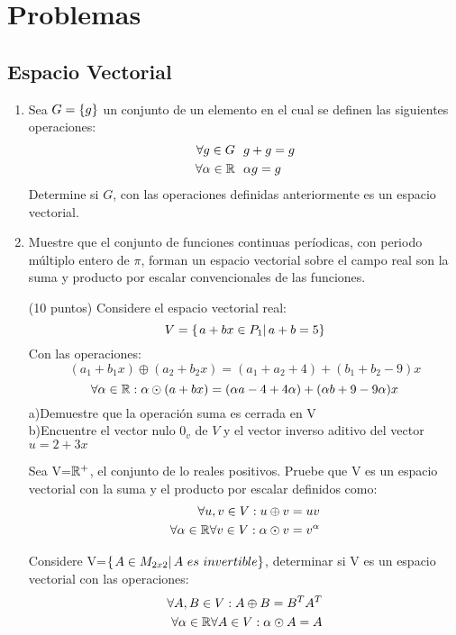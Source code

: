 \section{Problemas}
\subsection{Espacio Vectorial}
\begin{enumerate}[1.]
\item Sea $G= \left\{g \right\} $ un conjunto de un elemento en el cual se definen las siguientes operaciones:
\begin{align*}
\forall g \in G\ \  &g+g=g\\
\forall \alpha\in \mathbb{R}\ \ &\alpha g=g \\
\end{align*}
Determine si $G$, con las operaciones definidas anteriormente es un espacio vectorial.

\item Muestre que el conjunto de funciones continuas períodicas, con periodo múltiplo entero de $\pi$, forman un espacio vectorial sobre el campo real son la suma y producto por escalar convencionales de las funciones.


\begin{prob}
(10 puntos) Considere el espacio vectorial real:
\[V=\left\{ \left. a+bx \in P_1\right| a+b=5 \right\}\]
Con las operaciones:
 \[(a_1+b_1 x)\oplus(a_2+b_2 x)=(a_1+a_2+4)+(b_1+b_2-9)x\]
 \[ \forall \alpha \in \mathbb{R}:  \alpha\odot (a+b x)=(\alpha a-4+4\alpha)+(\alpha b+9-9\alpha)x\]
 a)Demuestre que la operaci\'on suma es cerrada en V~\\
 b)Encuentre el vector nulo $0_v$ de $V$ y el vector inverso aditivo del vector $u=2+3x$
\end{prob}

\begin{prob}
Sea V=$\mathbb{R}^+$, el conjunto de lo reales positivos. Pruebe que V es un espacio vectorial con la suma y el producto por escalar definidos como:
\begin{align*}
\forall u, v \in V: u\oplus v=uv\\
\forall \alpha \in \mathbb{R} \forall v \in V: \alpha\odot v =v^\alpha
\end{align*}
\end{prob}

\begin{prob}
Considere V=$\llaves{A\in M_{2x2}}{A\ es\ invertible}$, determinar si V es un espacio vectorial con las operaciones:
\begin{align*}
\forall A, B \in V: A\oplus B=B^T A^T\\
\forall \alpha \in \mathbb{R} \forall A \in V: \alpha\odot A =A
\end{align*}
\end{prob}



\end{enumerate}
